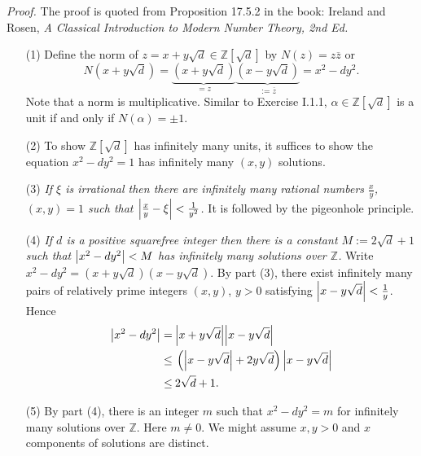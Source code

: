 \documentclass{article}
\begin{document}
\emph{Proof.}
The proof is quoted from Proposition 17.5.2 in the book:
Ireland and Rosen, \emph{A Classical Introduction to Modern Number Theory, 2nd Ed.}
\begin{enumerate}
\item[(1)]
  Define the norm of $z = x + y\sqrt{d} \in \mathbb{Z}[\sqrt{d}]$ by
  $N(z) = z \overline{z}$ or
  \[
    N(x + y\sqrt{d})
    = \underbrace{(x + y\sqrt{d})}_{= z} \underbrace{(x - y\sqrt{d})}_{:= \overline{z}}
    = x^2 - dy^2.
  \]
  Note that a norm is multiplicative.
  Similar to Exercise I.1.1,
  $\alpha \in \mathbb{Z}[\sqrt{d}]$ is a unit if and only if $N(\alpha) = \pm 1$.

\item[(2)]
  To show $\mathbb{Z}[\sqrt{d}]$ has infinitely many units, it suffices to show
  the equation $x^2 - dy^2 = 1$ has infinitely many $(x,y)$ solutions.

\item[(3)]
  \emph{If $\xi$ is irrational then there are infinitely many rational numbers
  $\frac{x}{y}$, $(x,y) = 1$ such that $\abs{\frac{x}{y}-\xi} < \frac{1}{y^2}$.}
  It is followed by the pigeonhole principle.

\item[(4)]
  \emph{If $d$ is a positive squarefree integer then there is a constant $M := 2\sqrt{d}+1$
  such that $\abs{x^2 - dy^2} < M$ has infinitely many solutions over $\mathbb{Z}$.}
  Write $x^2 - dy^2 = (x + y\sqrt{d})(x - y\sqrt{d})$.
  By part (3), there exist infinitely many pairs of relatively prime integers $(x,y)$, $y > 0$
  satisfying $\abs{x - y\sqrt{d}} < \frac{1}{y}$.
  Hence
  \begin{align*}
    \abs{x^2 - dy^2}
    =& \: \abs{x + y\sqrt{d}}\abs{x - y\sqrt{d}} \\
    \leq & \: \left(\abs{x - y\sqrt{d}} + 2 y\sqrt{d} \right) \abs{x - y\sqrt{d}} \\
    \leq & \: 2 \sqrt{d} + 1.
  \end{align*}

\item[(5)]
  By part (4), there is an integer $m$ such that $x^2 - dy^2 = m$
  for infinitely many solutions over $\mathbb{Z}$.
  Here $m \neq 0$.
  We might assume $x, y > 0$ and $x$ components of solutions are distinct.


\end{enumerate}
\end{document}
